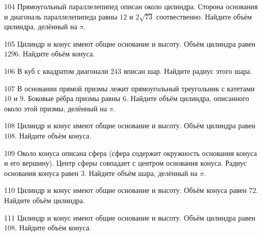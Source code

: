 \documentclass[4apaper]{article}
\begin{document}
\begin{taskBN}{104}
Прямоугольный параллелепипед описан около цилиндра. Сторона основания и диагональ параллелепипеда равны $12$ и $2\sqrt{73}$ соотвественно. Найдите объём цилиндра, делённый на $\pi$.
\end{taskBN}

\begin{taskBN}{105}
Цилиндр и конус имеют общие основание и высоту. Объём цилиндра равен $1296$. Найдите объём конуса.
\end{taskBN}

\begin{taskBN}{106}
В куб с квадратом диагонали $243$ вписан шар. Найдите радиус этого шара.
\end{taskBN}

\begin{taskBN}{107}
В основании прямой призмы лежит прямоугольный треугольник с катетами $10$ и $9$. Боковые рёбра призмы равны $6$. Найдите объём цилиндра, описанного около этой призмы, делённый на $\pi$.
\end{taskBN}

\begin{taskBN}{108}
Цилиндр и конус имеют общие основание и высоту. Объём цилиндра равен $108$. Найдите объём конуса.
\end{taskBN}

\begin{taskBN}{109}
Около конуса описана сфера (сфера содержит окружность основания конуса и его вершину). Центр сферы совпадает с центром основания конуса. Радиус основания конуса равен $3$. Найдите объём шара, делённый на $\pi$.
\end{taskBN}

\begin{taskBN}{110}
Цилиндр и конус имеют общие основание и высоту. Объём конуса равен $72$. Найдите объём цилиндра.
\end{taskBN}

\begin{taskBN}{111}
Цилиндр и конус имеют общие основание и высоту. Объём цилиндра равен $108$. Найдите объём конуса.
\end{taskBN}
\end{document}
